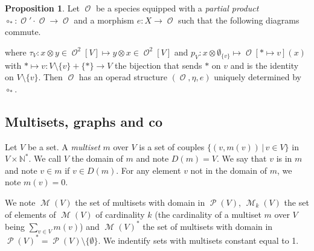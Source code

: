 \documentclass[a4paper]{article}
\DeclareMathOperator{\id}{id}
\DeclareMathOperator{\p}{\mathcal{P}}
\DeclareMathOperator{\m}{\mathcal{M}}
\DeclareMathOperator{\op}{\mathcal{O}}
\theoremstyle{definition}
\newtheorem{proposition}[definition]{Proposition}
\begin{document}
\begin{proposition}
\label{pp}
Let $\op$ be a species equipped with a \textit{partial product} $\circ_{\ast}:\op'\cdot\op\rightarrow \op$ and a morphism $e:X \rightarrow \op$ such that the following diagrams commute.
\begin{center}
\end{center}
\begin{center}
\end{center}
where $\tau_V:x\otimes y\in \op^2[V] \mapsto y\otimes x\in \op^2[V]$ and $p_V: x\otimes \emptyset_{\{v\}} \mapsto \op[\ast\mapsto v](x)$ with $\ast\mapsto v: V\setminus\{v\} + \{\ast\}\rightarrow V$ the bijection that sends $\ast$ on $v$ and is the identity on $V\setminus\{v\}$.
Then $\op$ has an operad structure $(\op,\eta,e)$ uniquely determined by $\circ_{\ast}$.
\end{proposition}


\subsection{Multisets, graphs and co}

Let $V$ be a set. A \textit{multiset} $m$ over $V$ is a set of couples $\{(v,m(v))\,|\, v\in V\}$ in $V\times\mathbb{N}^*$. We call $V$ the domain of $m$ and note $D(m)=V$. We say that $v$ is in $m$ and note $v\in m$ if $v\in D(m)$. For any element $v$ not in the domain of $m$, we note $m(v) = 0$.

We note $\m(V)$ the set of multisets with domain in $\p(V)$, $\m_k(V)$ the set of elements of $\m(V)$ of cardinality $k$ (the cardinality of a multiset $m$ over $V$ being $\sum_{v\in V} m(v)$) and $\m(V)^*$ the set of multisets with domain in $\p(V)^* = \p(V)\setminus\{\emptyset\}$. We indentify sets with multisets constant equal to 1.
\end{document}
